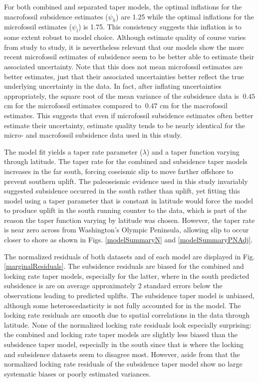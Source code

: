 {For both combined and separated taper models, the optimal inflations for the macrofossil subsidence estimates ($\psi_h$) are 1.25 while the optimal inflations for the microfossil estimates  ($\psi_l$) is 1.75.  This consistency suggests this inflation is to some extent robust to model choice.  Although estimate quality of course varies from study to study, it is nevertheless relevant that our models show the more recent microfossil estimates of subsidence seem to be better able to estimate their associated uncertainty.  Note that this does not mean microfossil estimates are better estimates, just that their associated uncertainties better reflect the true underlying uncertainty in the data.  In fact, after inflating uncertainties appropriately, the square root of the mean variance of the subsidence data is $~0.45$ cm for the microfossil estimates compared to $~0.47$ cm for the macrofossil estimates.  This suggests that even if microfossil subsidence estimates often better estimate their uncertainty, estimate quality tends to be nearly identical for the micro- and macrofossil subsidence data used in this study.

The model fit yields a taper rate parameter ($\lambda$) and a taper function varying through latitude.  The taper rate for the combined and subsidence taper models increases in the far south, forcing coseismic slip to move farther offshore to prevent southern uplift.  The paleoseismic evidence used in this study invariably suggested subsidence occurred in the south rather than uplift, yet fitting this model using a taper parameter that is constant in latitude would force the model to produce uplift in the south running counter to the data, which is part of the reason the taper function varying by latitude was chosen.  However, the taper rate is near zero across from Washington's Olympic Peninsula, allowing slip to occur closer to shore as shown in Figs. \ref{modelSummaryN} and \ref{modelSummaryPNAdj}.

The normalized residuals of both datasets and of each model are displayed in Fig. \ref{marginalResiduals}.  The subsidence residuals are biased for the combined and locking rate taper models, especially for the latter, where in the south predicted subsidence is are on average approximately 2 standard errors below the observations leading to predicted uplifts.  The subsidence taper model is unbiased, although some heteroscedasticity is not fully accounted for in the model.  The locking rate residuals are smooth due to spatial correlations in the data through latitude.  None of the normalized locking rate residuals look especially surprising: the combined and locking rate taper models are slightly less biased than the subsidence taper model, especially in the south since that is where the locking and subsidence datasets seem to disagree most.  However, aside from that the normalized locking rate residuals of the subsidence taper model show no large systematic biases or poorly estimated variances.

}
